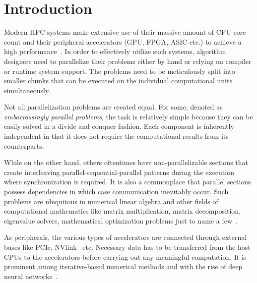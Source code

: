 \chapter{Introduction}
\label{chap:introduction}
Modern HPC systems make extensive use of their massive amount of CPU core count 
and their peripheral accelerators (GPU, FPGA, ASIC etc.) to achieve a high 
performance~\cite{gropp10, sierra, titan, mn4}.  In order to effectively utilize 
such systems, algorithm designers need to parallelize their problems either by 
hand or relying on compiler or runtime system support. The problems need to be 
meticulously split into smaller chunks that can be executed on the individual 
computational units simultaneously. 

Not all parallelization problems are created equal. For some, denoted as 
\textit{embarrassingly parallel problems}, the task is relatively simple because 
they can be easily solved in a divide and conquer fashion. Each component is 
inherently independent in that it does not require the computational results 
from its counterparts.  

While on the other hand, others oftentimes have non-parallelizable sections that 
create interleaving parallel-sequential-parallel patterns during the execution 
where synchronization is required. It is also a commonplace that parallel 
sections possess dependencies in which case communication inevitably occur.
Such problems are ubiquitous in numerical linear algebra and other fields of 
computational mathematics like matrix multiplication, matrix decomposition, 
eigenvalue solvers, mathematical optimization problems just to name a 
few~\cite{communication0, communication1, communication2, communication3}.

As peripherals, the various types of accelerators are connected through external 
buses like PCIe, NVlink~\cite{nvlink} etc. Necessary data has to be transferred 
from the host CPUs to the accelerators before carrying out any meaningful 
computation. It is prominent among iterative-based numerical methods and with 
the rise of deep neural networks~\cite{ca0, ca1, ca2, ca3}.

